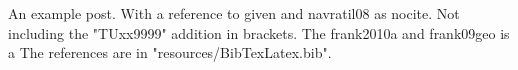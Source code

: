 \documentclass[a4paper,10pt]{scrbook}
\begin{document}
An example post.\citep{fenner2012a} With a reference
to\citep{frank09geo} given and navratil08 as nocite. Not including the
"TUxx9999" addition in brackets. The frank2010a and frank09geo is a The
references are in "resources/BibTexLatex.bib".

\printindex
\end{document}
